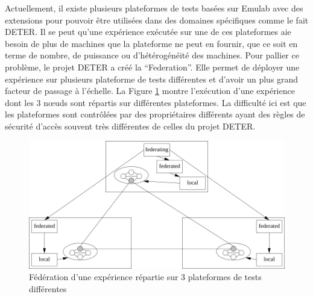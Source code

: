 Actuellement, il existe plusieurs plateformes de tests basées sur Emulab avec
des extensions pour pouvoir être utilisées dans des domaines spécifiques comme
le fait DETER. Il se peut qu'une expérience exécutée sur une de ces plateformes
aie besoin de plus de machines que la plateforme ne peut en fournir, que ce soit
en terme de nombre, de puissance ou d'hétérogénéité des machines. Pour pallier
ce problème, le projet DETER a créé la
``Federation''\citep{DETER_faber2007deter}. Elle permet de déployer une
expérience sur plusieurs plateforme de tests différentes et d'avoir un plus
grand facteur de passage à l'échelle. La Figure \ref{Federation} montre
l'exécution d'une expérience dont les 3 n\oe uds sont répartis sur différentes
plateformes. La difficulté ici est que les plateformes sont contrôlées par des
propriétaires différents ayant des règles de sécurité d'accès souvent très
différentes de celles du projet DETER.

\begin{figure}
  \centering \includegraphics[scale=0.75]{Pictures/png/Deter_federation}
  \caption{Fédération d'une expérience répartie sur 3 plateformes de tests différentes}
  \label{Federation}
\end{figure}

